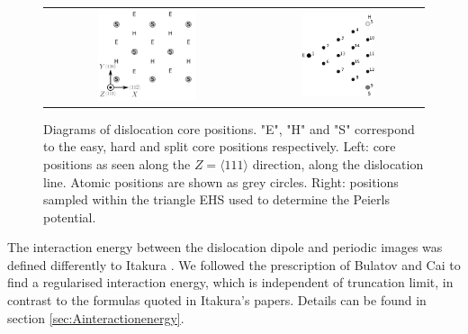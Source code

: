 \documentclass[a4paper,12pt,oneside,print,numbered,index,PageStyleIII]{PhDThesisPSnPDF}
\begin{document}
        \begin{figure}
    \begin{tabular}{cc}
	     \includegraphics[width=0.5\textwidth]{Images/hardeasycoreatomdiagram_coordnew.png} &
             \includegraphics[width=0.45\textwidth]{Images/peierls_potential_positions_tbe.png}  \\
    \end{tabular}
\caption{Diagrams of dislocation core positions. "E", "H" and "S" correspond to the easy, hard and split core positions respectively. Left: core positions as seen along the $Z=\langle 111 \rangle$ direction, along the dislocation line. Atomic positions are shown as grey circles. Right: positions sampled within the triangle EHS used to determine the Peierls potential.  \label{sampledpositions}}
	\label{fig:peierlspot}
    \end{figure}


The interaction energy between the dislocation dipole and periodic images was defined differently
to Itakura \cite{Itakura2012}. We followed the prescription of Bulatov and Cai \cite{vasilybulatov2006} to
find a regularised interaction energy, which is independent of truncation limit, in contrast to
the formulas quoted in Itakura's papers. Details can be found in section \ref{sec:Ainteractionenergy}.
\end{document}
